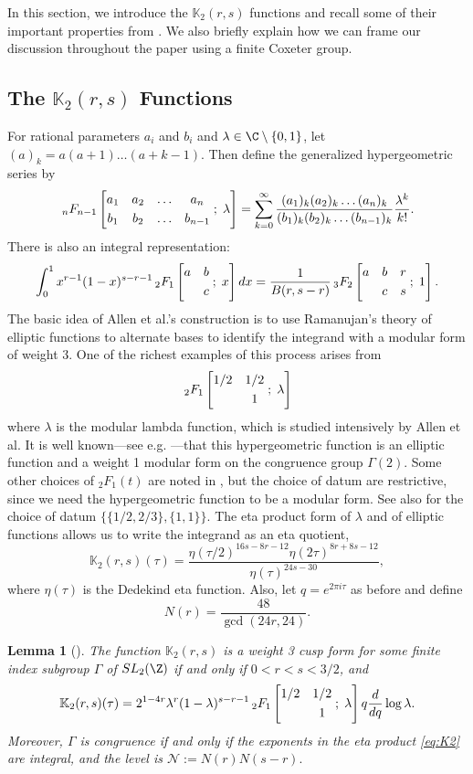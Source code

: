 \documentclass[12pt]{amsart}
\newtheorem{Lemma}[theorem]{Lemma}
\theoremstyle{definition}
\theoremstyle{remark}
\newcommand*\HYPERskip{&}
\newcommand*\pfq{
\begingroup
\catcode`\,\active
\def ,{\HYPERskip}
\doHyper
}
\def\doHyper#1#2#3#4#5{
\, _{#1}F_{#2}\left[\begin{matrix}#3 \smallskip \\  #4\end{matrix} \; ; \; #5\right]
\endgroup
}
\begin{document}
In this section, we introduce the $\mathbb{K}_2(r,s)$ functions and recall some of their important properties from \cite{aglt}. We also briefly explain how we can frame our discussion throughout the paper using a finite Coxeter group.
\subsection{The $\mathbb{K}_2(r,s)$ Functions}
For rational parameters $a_i$ and $b_i$ and $\lambda\in \C\setminus\{0,1\}$, let $(a)_k=a(a+1)\dots(a+k-1)$. Then define the generalized hypergeometric series by $$\pfq{n}{n-1}{a_1,a_2,\dots,a_n}{b_1,b_2,\dots,b_{n-1}}{\lambda}=\sum_{k=0}^\infty\frac{(a_1)_k(a_2)_k\dots(a_n)_k}{(b_1)_k(b_2)_k\dots(b_{n-1})_k}\frac{\lambda^k}{k!}.$$ There is also an integral representation:  $$ \int_0^1x^{r-1}(1-x)^{s-r-1}\pfq{2}{1}{a,b}{,c}{x}dx=\frac{1}{B(r,s-r)}\pfq{3}{2}{a,b,r}{,c,s}{1}.$$ The basic idea of Allen et al.'s \cite{aglt} construction  is to use Ramanujan's theory of elliptic functions to alternate bases to identify the integrand with a modular form of weight 3. One of the richest examples of this process arises from $$\pfq{2}{1}{1/2,1/2}{,1}{\lambda}$$ where $\lambda$ is the modular lambda function, which is studied intensively by Allen et al.  It is well known---see e.g. \cite{yang}---that this hypergeometric function is an elliptic function and a weight 1 modular form on the congruence group $\Gamma(2)$. Some other choices of ${}_2F_1(t)$ are noted in \cite{aglt}, but the choice of datum are restrictive, since we need the hypergeometric function to be a modular form. See also \cite{grove} for the choice of datum $\{\{1/2,2/3\},\{1,1\}\}$. The eta product form of $\lambda$ and of elliptic functions allows us to write the integrand as an eta quotient, 
\begin{equation}\label{eq:K2}
    \mathbb{K}_2(r,s)(\tau)= \frac{\eta(\tau/2)^{16s-8r-12}\eta(2\tau)^{8r+8s-12}}{\eta(\tau)^{24s-30}},
\end{equation} where $\eta(\tau)$ is the Dedekind eta function. Also, let $q=e^{2\pi i\tau}$ as before and define \begin{equation}\label{N}
    N(r)=\frac{48}{\gcd(24r,24)}.
\end{equation} 

\begin{Lemma}[\cite{aglt}]\label{aglt}
      The function $\mathbb{K}_2(r,s)$ is a weight 3 cusp form for some finite index subgroup $\Gamma$ of $SL_2(\Z)$ if and only if $0<r<s<3/2$, and $$\mathbb{K}_2(r,s)(\tau)=2^{1-4r}\lambda^r(1-\lambda)^{s-r-1}\pfq{2}{1}{1/2,1/2}{,1}{\lambda}q\frac{d}{dq}\log \lambda.$$ Moreover, $\Gamma$ is congruence if and only if the exponents in the eta product  \eqref{eq:K2} are integral, and the level is $\mathcal{N}:=N(r)N(s-r).$
\end{Lemma}
\end{document}
